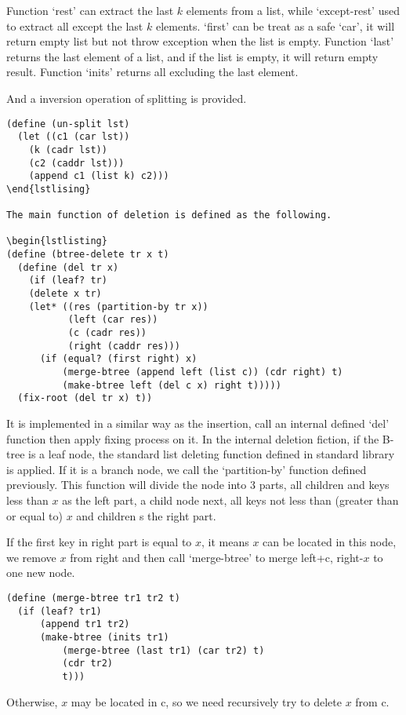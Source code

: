 \documentclass{article}
\begin{document}
Function `rest' can extract the last $k$ elements from a list, while
`except-rest' used to extract all except the last $k$ elements.
`first' can be treat as a safe `car', it will return empty list but not
throw exception when the list is empty. Function `last' returns the
last element of a list, and if the list is empty, it will return
empty result. Function `inits' returns all excluding the last element.

And a inversion operation of splitting is provided.

\begin{lstlisting}
(define (un-split lst)
  (let ((c1 (car lst))
	(k (cadr lst))
	(c2 (caddr lst)))
    (append c1 (list k) c2)))
\end{lstlising}

The main function of deletion is defined as the following.

\begin{lstlisting}
(define (btree-delete tr x t)
  (define (del tr x)
    (if (leaf? tr)
	(delete x tr)
	(let* ((res (partition-by tr x))
	       (left (car res))
	       (c (cadr res))
	       (right (caddr res)))
	  (if (equal? (first right) x)
	      (merge-btree (append left (list c)) (cdr right) t)
	      (make-btree left (del c x) right t)))))
  (fix-root (del tr x) t))
\end{lstlisting}

It is implemented in a similar way as the insertion, call an internal
defined `del' function then apply fixing process on it. In the internal
deletion fiction, if the B-tree is a leaf node, the standard list
deleting function defined in standard library is applied. If it is
a branch node, we call the `partition-by' function defined previously.
This function will divide the node into 3 parts, all children and
keys less than $x$ as the left part, a child node next, all keys not less
than (greater than or equal to) $x$ and children s the right part.

If the first key in right part is equal to $x$, it means $x$ can
be located in this node, we remove $x$ from right and then
call `merge-btree' to merge left+c, right-$x$ to one new node.

\begin{lstlisting}
(define (merge-btree tr1 tr2 t)
  (if (leaf? tr1)
      (append tr1 tr2)
      (make-btree (inits tr1)
		  (merge-btree (last tr1) (car tr2) t)
		  (cdr tr2)
		  t)))
\end{lstlisting}

Otherwise, $x$ may be located in c, so we need recursively try
to delete $x$ from c.
\end{document}
